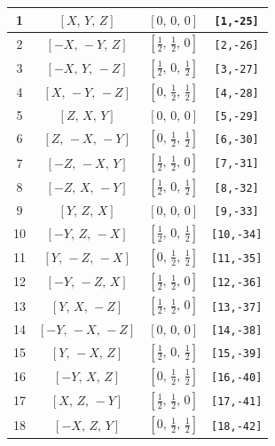 \documentclass[fleqn,8pt]{jsarticle}
\begin{document}
\begin{longtable}{cccc}
1 & $\left[ X,\, Y,\, Z \right]$ & $\left[ 0,\, 0,\, 0 \right]$ & {\tt [1,-25]} \\ \hline
2 & $\left[ - X,\, - Y,\, Z \right]$ & $\left[ \frac{1}{2},\, \frac{1}{2},\, 0 \right]$ & {\tt [2,-26]} \\ \hline
3 & $\left[ - X,\, Y,\, - Z \right]$ & $\left[ \frac{1}{2},\, 0,\, \frac{1}{2} \right]$ & {\tt [3,-27]} \\ \hline
4 & $\left[ X,\, - Y,\, - Z \right]$ & $\left[ 0,\, \frac{1}{2},\, \frac{1}{2} \right]$ & {\tt [4,-28]} \\ \hline
5 & $\left[ Z,\, X,\, Y \right]$ & $\left[ 0,\, 0,\, 0 \right]$ & {\tt [5,-29]} \\ \hline
6 & $\left[ Z,\, - X,\, - Y \right]$ & $\left[ 0,\, \frac{1}{2},\, \frac{1}{2} \right]$ & {\tt [6,-30]} \\ \hline
7 & $\left[ - Z,\, - X,\, Y \right]$ & $\left[ \frac{1}{2},\, \frac{1}{2},\, 0 \right]$ & {\tt [7,-31]} \\ \hline
8 & $\left[ - Z,\, X,\, - Y \right]$ & $\left[ \frac{1}{2},\, 0,\, \frac{1}{2} \right]$ & {\tt [8,-32]} \\ \hline
9 & $\left[ Y,\, Z,\, X \right]$ & $\left[ 0,\, 0,\, 0 \right]$ & {\tt [9,-33]} \\ \hline
10 & $\left[ - Y,\, Z,\, - X \right]$ & $\left[ \frac{1}{2},\, 0,\, \frac{1}{2} \right]$ & {\tt [10,-34]} \\ \hline
11 & $\left[ Y,\, - Z,\, - X \right]$ & $\left[ 0,\, \frac{1}{2},\, \frac{1}{2} \right]$ & {\tt [11,-35]} \\ \hline
12 & $\left[ - Y,\, - Z,\, X \right]$ & $\left[ \frac{1}{2},\, \frac{1}{2},\, 0 \right]$ & {\tt [12,-36]} \\ \hline
13 & $\left[ Y,\, X,\, - Z \right]$ & $\left[ \frac{1}{2},\, \frac{1}{2},\, 0 \right]$ & {\tt [13,-37]} \\ \hline
14 & $\left[ - Y,\, - X,\, - Z \right]$ & $\left[ 0,\, 0,\, 0 \right]$ & {\tt [14,-38]} \\ \hline
15 & $\left[ Y,\, - X,\, Z \right]$ & $\left[ \frac{1}{2},\, 0,\, \frac{1}{2} \right]$ & {\tt [15,-39]} \\ \hline
16 & $\left[ - Y,\, X,\, Z \right]$ & $\left[ 0,\, \frac{1}{2},\, \frac{1}{2} \right]$ & {\tt [16,-40]} \\ \hline
17 & $\left[ X,\, Z,\, - Y \right]$ & $\left[ \frac{1}{2},\, \frac{1}{2},\, 0 \right]$ & {\tt [17,-41]} \\ \hline
18 & $\left[ - X,\, Z,\, Y \right]$ & $\left[ 0,\, \frac{1}{2},\, \frac{1}{2} \right]$ & {\tt [18,-42]} \\ \hline

\end{longtable}
\end{document}
